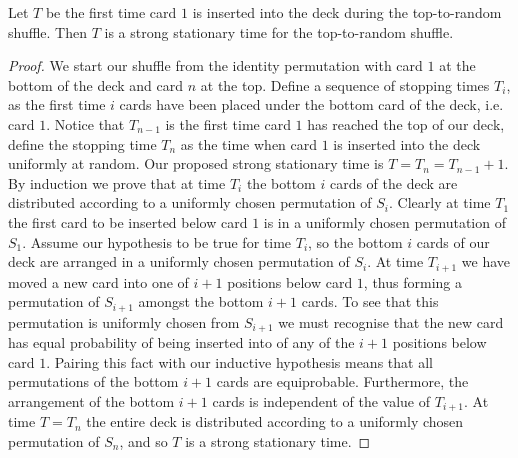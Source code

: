 \documentclass[11pt]{report}
\begin{document}
\begin{lemma}
	\label{chpt4:lem:sst}
	Let $T$ be the first time card $1$ is inserted into the deck during the top-to-random shuffle. Then $T$ is a strong stationary time for the top-to-random shuffle.
\end{lemma}
\begin{proof}
	We start our shuffle from the identity permutation with card $1$ at the 
	bottom of the deck and card $n$ at the top. Define a sequence of stopping 
	times $T_{i}$, as the first time $i$ cards have been placed under the bottom card of the deck, i.e. card $1$. Notice that $T_{n-1}$ is the first time card $1$ has reached the top of our deck, define the stopping time $T_{n}$ as the time when card $1$ is inserted into the deck uniformly at random. Our proposed strong stationary time is $T= T_{n} = T_{n-1}+1$. By induction we prove that at time $T_{i}$ the bottom $i$ cards of the deck are distributed according to a uniformly chosen permutation of $S_{i}$. Clearly at time $T_{1}$ the first card to be inserted below card $1$ is in a uniformly chosen permutation of $S_{1}$. Assume our hypothesis to be true for time 
	$T_{i}$, so the bottom $i$ cards of our deck are arranged in a uniformly chosen permutation of $S_{i}$. At time $T_{i+1}$ we have moved a new card into one of 
	$i+1$ positions below card $1$, thus forming a permutation of $S_{i+1}$ 
	amongst the bottom $i+1$ cards. To see that this permutation is 
	uniformly chosen from $S_{i+1}$ we must recognise that the new card has equal probability of being inserted into of any of the $i+1$ positions below card $1$. Pairing this fact with our inductive hypothesis means that all permutations of the bottom $i+1$ cards are equiprobable. Furthermore, the arrangement of the bottom $i+1$ cards is independent of the value of $T_{i+1}$.
	At time $T = T_{n}$ the entire deck is distributed according to a uniformly chosen permutation of $S_{n}$, and so $T$ is a strong stationary time.
\end{proof}
\end{document}
